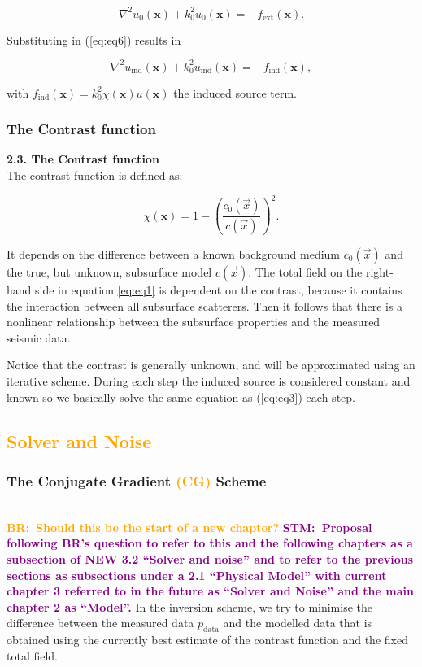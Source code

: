 \documentclass[10pt,a4paper]{article}
\newcommand{\commentstmtwo}[1]{\textcolor{purple}{\textbf{STM:\ #1}}}
\newcommand{\oldstm}[1]{\sout{#1}}
\newcommand{\oldstmtwo}[1]{\xout{#1}}
\newcommand{\commentbr}[1]{\textcolor{orange}{\textbf{BR:\ #1}}}
\begin{document}
\begin{equation} \label{eq:eq6}
\nabla^2 u_0(\mathbf{x}) + k_0^2 u_0(\mathbf{x}) = -f_{\text{ext}}(\mathbf{x}).
\end{equation}

Substituting in (\ref{eq:eq6}) results in

\begin{equation} \label{eq:eq7}
\nabla^2 u_\text{ind}(\mathbf{x}) + k_0^2 u_\text{ind}(\mathbf{x}) =
-f_\text{ind}(\mathbf{x}),
\end{equation}

with $f_\text{ind}(\mathbf{x}) = k_0^2 \chi(\mathbf{x}) u(\mathbf{x})$
the induced source term.


\subsubsection{The Contrast function}
\oldstm{\textbf{2.3. The Contrast function}}\\
The contrast function is defined as:

\begin{equation} \label{eq:eq8}\chi(\mathbf{x}) = 1 -
\left(\frac{c_0(\vec{x})}{c(\vec{x})} \right)^2. \end{equation}

It depends on the difference between a known background medium
$c_\text{0}(\vec{x})$ and the true, but unknown, subsurface model
$c(\vec{x})$. The total field on the right-hand side in equation
\ref{eq:eq1} is dependent on the contrast, because it contains the
interaction between all subsurface scatterers. Then it follows that
there is a nonlinear relationship between the subsurface properties
and the measured seismic data.

Notice that the contrast is generally unknown, and will be
approximated using an iterative scheme. During each step the induced
source is considered constant and known so we basically solve the same
equation as (\ref{eq:eq3}) each step.
\subsection{\textcolor{orange}{Solver and Noise}}
\subsubsection{The Conjugate Gradient \textcolor{orange}{(CG)} Scheme}
\label{conjgrad}
\oldstmtwo{\textbf{The Conjugate Gradient Scheme}}\\
\commentbr{Should this be the start of a new chapter?}
\commentstmtwo{Proposal following BR's question to refer to this and
the following chapters as a subsection of  NEW 3.2 ``Solver and noise'' and to refer to the previous sections as subsections under a
2.1 ``Physical Model'' with current chapter 3 referred to in the
future as ``Solver and Noise'' and the main chapter 2 as ``Model''.}
In the inversion scheme, we try to minimise the difference between the
measured data $p_\text{data}$ and the modelled data that is obtained
using the currently best estimate of the contrast function and the
fixed total field.
\end{document}
